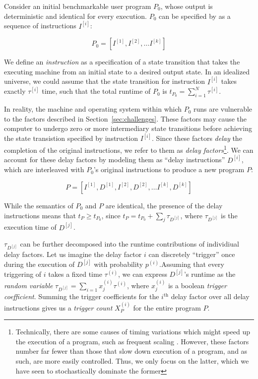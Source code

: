 \documentclass[conference]{IEEEtran}
\begin{document}
Consider an initial benchmarkable user program $P_0$, whose output is deterministic and
identical for every execution. $P_0$ can be specified by as a sequence of instructions
$I^{[i]}$:

\begin{equation}
    P_0 = \left[I^{[1]}, I^{[2]}, \dots I^{[k]}\right]
\end{equation}

We define an \textit{instruction} as a specification of a state transition that takes the
executing machine from an initial state to a desired output state. In an idealized universe,
we could assume that the state transition for instruction $I^{[i]}$ takes exactly
$\tau^{[i]}$ time, such that the total runtime of $P_0$ is $t_{P_0} = \sum_{i=1}^N
\tau^{[i]}$.

In reality, the machine and operating system within which $P_0$ runs are vulnerable to the
factors described in Section~\ref{sec:challenges}. These factors may cause the computer to
undergo zero or more intermediary state transitions before achieving the state transistion
specified by instruction $I^{[i]}$. Since these factors \textit{delay} the completion of the
original instructions, we refer to them as \textit{delay factors}\footnote{Technically,
there are some causes of timing variations which might speed up the execution of a program,
such as frequent scaling . However, these factors number far fewer than those
that slow down execution of a program, and as such, are more easily controlled. Thus, we
only focus on the latter, which we have seen to stochastically dominate the former
}. We can account for these delay factors by
modeling them as ``delay instructions'' $D^{[i]}$, which are interleaved with $P_0$'s
original instructions to produce a new program $P$:

\begin{equation}
    P = \left[I^{[1]}, D^{[1]}, I^{[2]}, D^{[2]}, \dots I^{[k]}, D^{[k]}\right]
\end{equation}

While the semantics of $P_0$ and $P$ are identical, the presence of the delay instructions
means that $t_P \ge t_{P_0}$, since $t_P = t_{P_0} + \sum_{j} \tau_{D^{[j]}}$, where
$\tau_{D^{[j]}}$ is the execution time of $D^{[j]}$.

$\tau_{D^{[j]}}$ can be further decomposed into the runtime contributions of individiual
delay factors. Let us imagine the delay factor $i$ can discretely ``trigger'' once during
the execution of $D^{[j]}$ with probability $p^{(i)}$.Assuming that every triggering of $i$
takes a fixed time $\tau^{(i)}$, we can express $D^{[j]}$'s runtime as the \textit{random
variable} $\tau_{D^{[j]}} = \sum_{i=1} x^{(i)}_j \tau^{(i)}$, where $x^{(i)}_j$ is a boolean
\textit{trigger coefficient}. Summing the trigger coefficients for the $i^{\textrm{th}}$
delay factor over all delay instructions gives us a \textit{trigger count}
$X_P^{(i)}$ for the entire program $P$.
\end{document}
